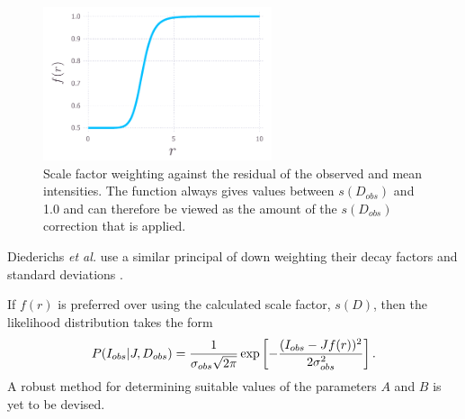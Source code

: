 \begin{figure}
  \centering
  \includegraphics[width=0.6\textwidth]{figures/zde/scale_factor_function.pdf}
    \caption[Scale factor weighting against the residual of the observed and mean intensities.]{Scale factor weighting against the residual of the observed and mean intensities.
    The function always gives values between $s(D_{obs})$ and 1.0 and can therefore be viewed as the amount of the $s(D_{obs})$ correction that is applied.}
    \label{fig:Scale factor weighting - Extrapolation method}
\end{figure}
Diederichs \textit{et al.} \cite{diederichs2003} use a similar principal of down weighting their decay factors and standard deviations \cite{diederichs2003}.

If $f(r)$ is preferred over using the calculated scale factor, $s(D)$, then the likelihood distribution takes the form
\begin{equation}
    P(I_{obs} | J, D_{obs}) = \frac{1}{\sigma_{obs} \sqrt{2\pi}} \exp \left[-\frac{(I_{obs} - J f(r))^2}{2 \sigma^2_{obs}} \right].
    \label{eq:Normally distributed intensity with weighted scale factor - Extrapolation method}
\end{equation}
A robust method for determining suitable values of the parameters $A$ and $B$ is yet to be devised.


